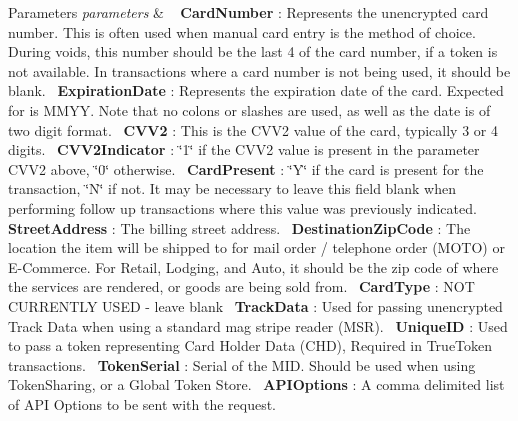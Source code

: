 \begin{DoxyParams}{Parameters}
{\em parameters} & ~\newline
 {\bfseries Card\+Number} \+: Represents the unencrypted card number. This is often used when manual card entry is the method of choice. During voids, this number should be the last 4 of the card number, if a token is not available. In transactions where a card number is not being used, it should be blank.~\newline
 {\bfseries Expiration\+Date} \+: Represents the expiration date of the card. Expected for is M\+M\+YY. Note that no colons or slashes are used, as well as the date is of two digit format.~\newline
 {\bfseries C\+V\+V2} \+: This is the C\+V\+V2 value of the card, typically 3 or 4 digits.~\newline
 {\bfseries C\+V\+V2\+Indicator} \+: \char`\"{}1\char`\"{} if the C\+V\+V2 value is present in the parameter C\+V\+V2 above, \char`\"{}0\char`\"{} otherwise.~\newline
 {\bfseries Card\+Present} \+: \char`\"{}\+Y\char`\"{} if the card is present for the transaction, \char`\"{}\+N\char`\"{} if not. It may be necessary to leave this field blank when performing follow up transactions where this value was previously indicated.~\newline
 {\bfseries Street\+Address} \+: The billing street address.~\newline
 {\bfseries Destination\+Zip\+Code} \+: The location the item will be shipped to for mail order / telephone order (M\+O\+TO) or E-\/\+Commerce. For Retail, Lodging, and Auto, it should be the zip code of where the services are rendered, or goods are being sold from.~\newline
 {\bfseries Card\+Type} \+: N\+OT C\+U\+R\+R\+E\+N\+T\+LY U\+S\+ED -\/ leave blank~\newline
 {\bfseries Track\+Data} \+: Used for passing unencrypted Track Data when using a standard mag stripe reader (M\+SR).~\newline
 {\bfseries Unique\+ID} \+: Used to pass a token representing Card Holder Data (C\+HD), Required in True\+Token transactions.~\newline
 {\bfseries Token\+Serial} \+: Serial of the M\+ID. Should be used when using Token\+Sharing, or a Global Token Store.~\newline
 {\bfseries A\+P\+I\+Options} \+: A comma delimited list of A\+PI Options to be sent with the request.~\newline

\end{DoxyParams}
